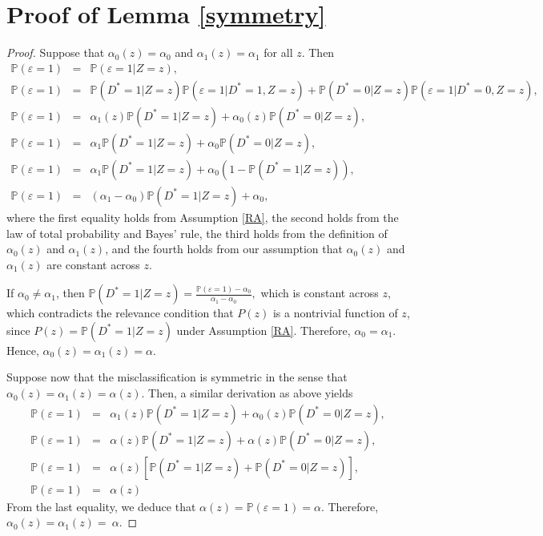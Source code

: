 \documentclass[11pt,reqno]{amsart}
\theoremstyle{plain}
\numberwithin{equation}{section}
\begin{document}
\section{Proof of Lemma \ref{symmetry}}\label{apx:prop_robust}
\begin{proof}\label{proof:symmetry}
Suppose that $\alpha_0(z)=\alpha_0$ and $\alpha_1(z)=\alpha_1$ for all $z$. Then 
\begin{eqnarray*}
\mathbb P(\varepsilon =1)&=& \mathbb P(\varepsilon=1\vert Z=z),\\
\mathbb P(\varepsilon =1)&=& \mathbb P(D^*=1 \vert Z=z) \mathbb P(\varepsilon=1\vert D^*=1, Z=z) + \mathbb P(D^*=0 \vert Z=z) \mathbb P(\varepsilon=1\vert D^*=0, Z=z),\\
\mathbb P(\varepsilon =1)&=& \alpha_1(z) \mathbb P(D^*=1 \vert Z=z)  + \alpha_0(z) \mathbb P(D^*=0 \vert Z=z),\\
\mathbb P(\varepsilon =1)&=& \alpha_1 \mathbb P(D^*=1 \vert Z=z)  + \alpha_0 \mathbb P(D^*=0 \vert Z=z),\\
\mathbb P(\varepsilon =1)&=& \alpha_1 \mathbb P(D^*=1 \vert Z=z)  + \alpha_0 (1-\mathbb P(D^*=1 \vert Z=z)),\\
\mathbb P(\varepsilon =1)&=&( \alpha_1-\alpha_0) \mathbb P(D^*=1 \vert Z=z)  + \alpha_0,
\end{eqnarray*}
where the first equality holds from Assumption \ref{RA}, the second holds from the law of total probability and Bayes' rule, the third holds from the definition of $\alpha_0(z)$ and $\alpha_1(z)$, and the fourth holds from our assumption that $\alpha_0(z)$ and $\alpha_1(z)$ are constant across $z$. 

If $\alpha_0 \neq \alpha_1$, then $\mathbb P(D^*=1 \vert Z=z)=\frac{\mathbb P(\varepsilon=1)-\alpha_0}{\alpha_1-\alpha_0},$ which is constant across $z$, which contradicts the relevance condition that $P(z)$ is a nontrivial function of $z$, since $P(z)=\mathbb P(D^*=1 \vert Z=z)$ under Assumption \ref{RA}. Therefore, $\alpha_0=\alpha_1.$ Hence, $\alpha_0(z)=\alpha_1(z)=\alpha.$

Suppose now that the misclassification is symmetric in the sense that $\alpha_0(z)=\alpha_1(z)=\alpha(z)$. Then, a similar derivation as above yields
\begin{eqnarray*}
\mathbb P(\varepsilon =1)&=& \alpha_1(z) \mathbb P(D^*=1 \vert Z=z)  + \alpha_0(z) \mathbb P(D^*=0 \vert Z=z),\\
\mathbb P(\varepsilon =1)&=& \alpha(z) \mathbb P(D^*=1 \vert Z=z)  + \alpha(z) \mathbb P(D^*=0 \vert Z=z),\\
\mathbb P(\varepsilon =1)&=& \alpha(z)\left[\mathbb P(D^*=1 \vert Z=z)  + \mathbb P(D^*=0 \vert Z=z)\right],\\
\mathbb P(\varepsilon =1)&=& \alpha(z)
\end{eqnarray*} 
From the last equality, we deduce that $\alpha(z)=\mathbb P(\varepsilon =1)=\alpha.$ Therefore, $\alpha_0(z)=\alpha_1(z)=~\alpha.$
\end{proof}
\end{document}
